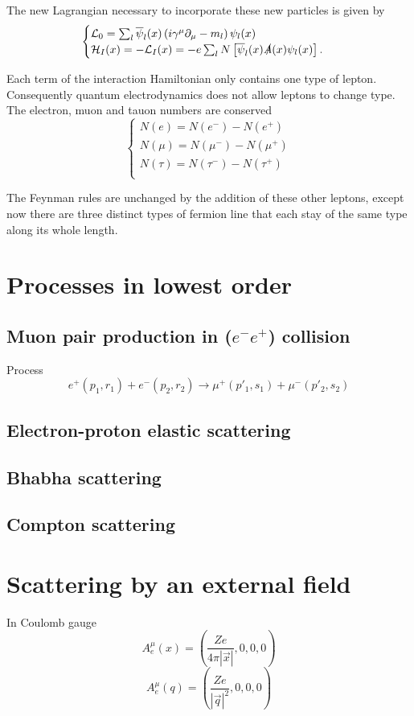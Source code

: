 The new Lagrangian necessary to incorporate these new particles is given by
\[ \begin{cases}
\mathcal{L} _0 = \sum_l \overline{\psi}_l(x)\left(i\gamma^\mu\partial_\mu - m_l\right)\psi_l(x) \\
\mathcal{H}_I(x) = -\mathcal{L} _I(x) = -e\sum_l N \left[\overline{\psi}_l(x)\slashed{A}(x)\psi_l(x)\right].
\end{cases} \]

Each term of the interaction Hamiltonian only contains one type of lepton. Consequently quantum electrodynamics does not allow leptons to change type. The electron, muon and tauon numbers are conserved
\[ \begin{cases}
N(e) = N(e^-) - N(e^+) \\
N(\mu) = N(\mu^-) - N(\mu^+) \\
N(\tau) = N(\tau^-) - N(\tau^+) \\
\end{cases} \]

The Feynman rules are unchanged by the addition of these other leptons, except now there are three distinct types of fermion line that each stay of the same type along its whole length.

\section{Processes in lowest order}
\subsection{Muon pair production in ($e^-e^+$) collision}
Process
\[ e^+(p_1,r_1) + e^-(p_2,r_2) \to \mu^+(p'_1, s_1) + \mu^-(p'_2,s_2) \]
\subsection{Electron-proton elastic scattering}
\subsection{Bhabha scattering}
\subsection{Compton scattering}
\section{Scattering by an external field}
In Coulomb gauge
\[ A^\mu_e(x) = \left(\frac{Ze}{4\pi |\vec{x}|},0,0,0\right) \]
\[ A^\mu_e(q) = \left(\frac{Ze}{|\vec{q}|^2},0,0,0\right) \]
